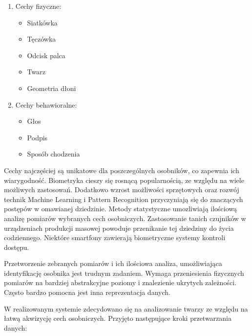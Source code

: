 \documentclass[oneside, eng]{mgr}
\begin{document}
\begin{enumerate}

\item Cechy fizyczne:
	\begin{itemize}
		\item Siatkówka
		\item Tęczówka
		\item Odcisk palca
		\item Twarz
		\item Geometria dłoni
	\end{itemize}

\item Cechy behawioralne:
	\begin{itemize}
		\item Głos
		\item Podpis
		\item Sposób chodzenia
	\end{itemize}

\end{enumerate} 

Cechy najczęściej są unikatowe dla poszczególnych osobników, co zapewnia ich wiarygodność. Biometryka cieszy się rosnącą popularnością, ze względu na wiele możliwych zastosowań. Dodatkowo wzrost możliwości sprzętowych oraz rozwój technik Machine Learning i Pattern Recognition przyczyniają się do znaczących postępów w omawianej dziedzinie. Metody statystyczne umozliwiają ilościową analizę pomiarów wybranych cech osobniczych. Zastosowanie tanich czujników w urządzeniach produkcji masowej powoduje przenikanie tej dziedziny do życia codziennego. Niektóre smartfony zawierają biometryczne systemy kontroli dostępu. 

Przetworzenie zebranych pomiarów i ich ilościowa analiza, umożliwiająca identyfikację osobnika jest trudnym zadaniem. Wymaga przeniesienia fizycznych pomiarów na bardziej abstrakcyjne poziomy i znalezienie ukrytych zależności. Często bardzo pomocna jest inna reprezentacja danych. 

W realizowanym systemie zdecydowano się na analizowanie twarzy ze względu na łatwą akwizycję cech osobniczych. Przyjęto następujące kroki przetwarzania danych:
\end{document}
